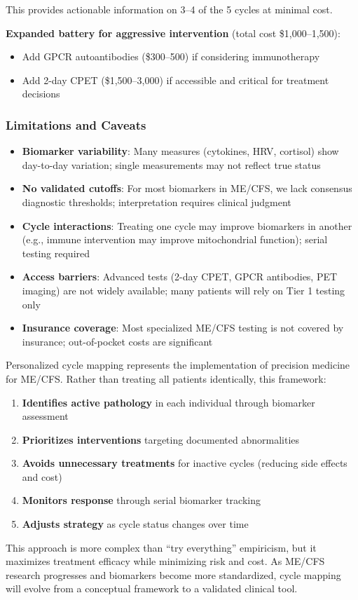 This provides actionable information on 3--4 of the 5 cycles at minimal cost.

\textbf{Expanded battery for aggressive intervention} (total cost \$1,000--1,500):
\begin{itemize}
    \item Add GPCR autoantibodies (\$300--500) if considering immunotherapy
    \item Add 2-day CPET (\$1,500--3,000) if accessible and critical for treatment decisions
\end{itemize}

\subsubsection{Limitations and Caveats}

\begin{itemize}
    \item \textbf{Biomarker variability}: Many measures (cytokines, HRV, cortisol) show day-to-day variation; single measurements may not reflect true status
    \item \textbf{No validated cutoffs}: For most biomarkers in ME/CFS, we lack consensus diagnostic thresholds; interpretation requires clinical judgment
    \item \textbf{Cycle interactions}: Treating one cycle may improve biomarkers in another (e.g., immune intervention may improve mitochondrial function); serial testing required
    \item \textbf{Access barriers}: Advanced tests (2-day CPET, GPCR antibodies, PET imaging) are not widely available; many patients will rely on Tier 1 testing only
    \item \textbf{Insurance coverage}: Most specialized ME/CFS testing is not covered by insurance; out-of-pocket costs are significant
\end{itemize}

\begin{keypoint}
Personalized cycle mapping represents the implementation of precision medicine for ME/CFS. Rather than treating all patients identically, this framework:
\begin{enumerate}
    \item \textbf{Identifies active pathology} in each individual through biomarker assessment
    \item \textbf{Prioritizes interventions} targeting documented abnormalities
    \item \textbf{Avoids unnecessary treatments} for inactive cycles (reducing side effects and cost)
    \item \textbf{Monitors response} through serial biomarker tracking
    \item \textbf{Adjusts strategy} as cycle status changes over time
\end{enumerate}

This approach is more complex than ``try everything'' empiricism, but it maximizes treatment efficacy while minimizing risk and cost. As ME/CFS research progresses and biomarkers become more standardized, cycle mapping will evolve from a conceptual framework to a validated clinical tool.
\end{keypoint}


